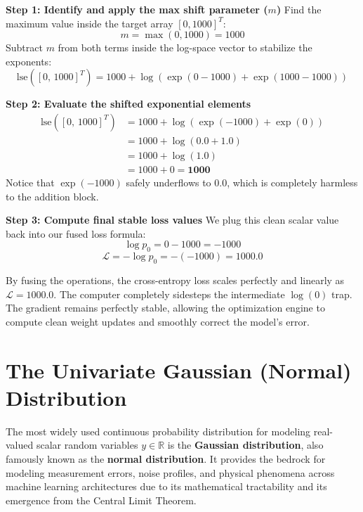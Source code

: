 \documentclass{article}
\begin{document}
\noindent \textbf{Step 1: Identify and apply the max shift parameter ($m$)}
Find the maximum value inside the target array $[0, 1000]^T$:
\begin{equation}
    m = \max(0, 1000) = 1000
\end{equation}
Subtract $m$ from both terms inside the log-space vector to stabilize the exponents:
\begin{equation}
    \text{lse}([0, \, 1000]^T) = 1000 + \log\left(\exp(0 - 1000) + \exp(1000 - 1000)\right)
\end{equation}

\noindent \textbf{Step 2: Evaluate the shifted exponential elements}
\begin{align*}
    \text{lse}([0, \, 1000]^T) &= 1000 + \log\left(\exp(-1000) + \exp(0)\right) \\
    &= 1000 + \log(0.0 + 1.0) \\
    &= 1000 + \log(1.0) \\
    &= 1000 + 0 = \mathbf{1000}
\end{align*}
Notice that $\exp(-1000)$ safely underflows to $0.0$, which is completely harmless to the addition block. 

\noindent \textbf{Step 3: Compute final stable loss values}
We plug this clean scalar value back into our fused loss formula:
\begin{equation}
    \log p_0 = 0 - 1000 = -1000
\end{equation}
\begin{equation}
    \mathcal{L} = -\log p_0 = -(-1000) = \mathbf{1000.0}
\end{equation}

\begin{tcolorbox}[colback=blue!5!white, colframe=blue!60!black, title=Core Takeaway]
By fusing the operations, the cross-entropy loss scales perfectly and linearly as $\mathcal{L} = 1000.0$. The computer completely sidesteps the intermediate $\log(0)$ trap. The gradient remains perfectly stable, allowing the optimization engine to compute clean weight updates and smoothly correct the model's error.
\end{tcolorbox}

\section*{The Univariate Gaussian (Normal) Distribution}

The most widely used continuous probability distribution for modeling real-valued scalar random variables $y \in \mathbb{R}$ is the \textbf{Gaussian distribution}, also famously known as the \textbf{normal distribution}. It provides the bedrock for modeling measurement errors, noise profiles, and physical phenomena across machine learning architectures due to its mathematical tractability and its emergence from the Central Limit Theorem.
\end{document}
